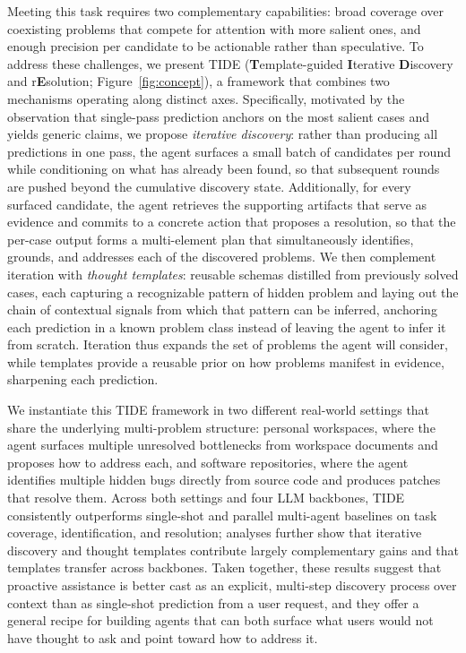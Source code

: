 Meeting this task requires two complementary capabilities: broad coverage over coexisting problems that compete for attention with more salient ones, and enough precision per candidate to be actionable rather than speculative. To address these challenges, we present \textsc{TIDE} (\textbf{T}emplate-guided \textbf{I}terative \textbf{D}iscovery and r\textbf{E}solution; Figure~\ref{fig:concept}), a framework that combines two mechanisms operating along distinct axes. Specifically, motivated by the observation that single-pass prediction anchors on the most salient cases and yields generic claims, we propose \textit{iterative discovery}: rather than producing all predictions in one pass, the agent surfaces a small batch of candidates per round while conditioning on what has already been found, so that subsequent rounds are pushed beyond the cumulative discovery state. Additionally, for every surfaced candidate, the agent retrieves the supporting artifacts that serve as evidence and commits to a concrete action that proposes a resolution, so that the per-case output forms a multi-element plan that simultaneously identifies, grounds, and addresses each of the discovered problems. We then complement iteration with \textit{thought templates}: reusable schemas distilled from previously solved cases, each capturing a recognizable pattern of hidden problem and laying out the chain of contextual signals from which that pattern can be inferred, anchoring each prediction in a known problem class instead of leaving the agent to infer it from scratch. Iteration thus expands the set of problems the agent will consider, while templates provide a reusable prior on how problems manifest in evidence, sharpening each prediction.

We instantiate this \textsc{TIDE} framework in two different real-world settings that share the underlying multi-problem structure: personal workspaces, where the agent surfaces multiple unresolved bottlenecks from workspace documents and proposes how to address each, and software repositories, where the agent identifies multiple hidden bugs directly from source code and produces patches that resolve them. Across both settings and four LLM backbones, \textsc{TIDE} consistently outperforms single-shot and parallel multi-agent baselines on task coverage, identification, and resolution; analyses further show that iterative discovery and thought templates contribute largely complementary gains and that templates transfer across backbones. Taken together, these results suggest that proactive assistance is better cast as an explicit, multi-step discovery process over context than as single-shot prediction from a user request, and they offer a general recipe for building agents that can both surface what users would not have thought to ask and point toward how to address it.

